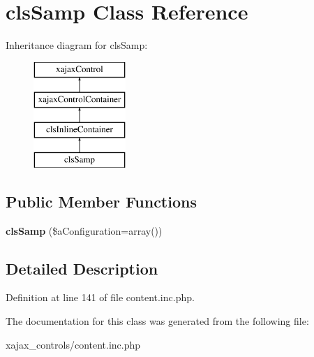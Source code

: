 \hypertarget{classclsSamp}{
\section{clsSamp Class Reference}
\label{classclsSamp}
}
Inheritance diagram for clsSamp:\begin{figure}[H]
\begin{center}
\leavevmode
\includegraphics[height=4.000000cm]{classclsSamp}
\end{center}
\end{figure}
\subsection*{Public Member Functions}
\begin{DoxyCompactItemize}
\item 
\hypertarget{classclsSamp_a9f8216128c7b4ed441a8c8f5fe2c2c12}{
{\bfseries clsSamp} (\$aConfiguration=array())}
\label{classclsSamp_a9f8216128c7b4ed441a8c8f5fe2c2c12}

\end{DoxyCompactItemize}


\subsection{Detailed Description}


Definition at line 141 of file content.inc.php.



The documentation for this class was generated from the following file:\begin{DoxyCompactItemize}
\item 
xajax\_\-controls/content.inc.php\end{DoxyCompactItemize}
